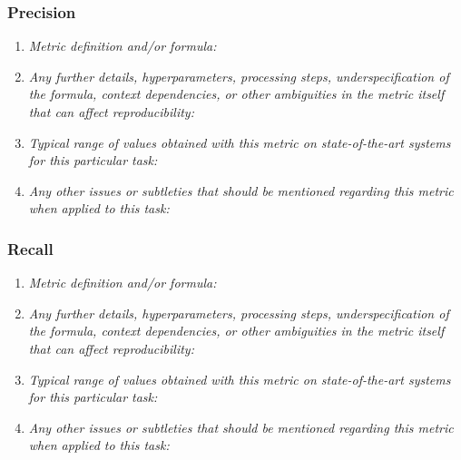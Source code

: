 \documentclass[a4paper,11pt]{article}
\begin{document}
        \subsubsection{Precision}
            \begin{enumerate}[label=\alph*.]
                \item \textit{Metric definition and/or formula:}
                \bigskip
                \item \textit{Any further details, hyperparameters, processing steps, underspecification of the formula, context dependencies, or other ambiguities in the metric itself that can affect reproducibility:}
                \bigskip
                \item \textit{Typical range of values obtained with this metric on state-of-the-art systems for this particular task:}
                \bigskip
                \item \textit{Any other issues or subtleties that should be mentioned regarding this metric when applied to this task:}
                \bigskip
            \end{enumerate}
        \subsubsection{Recall}
            \begin{enumerate}[label=\alph*.]
                \item \textit{Metric definition and/or formula:}
                \bigskip
                \item \textit{Any further details, hyperparameters, processing steps, underspecification of the formula, context dependencies, or other ambiguities in the metric itself that can affect reproducibility:}
                \bigskip
                \item \textit{Typical range of values obtained with this metric on state-of-the-art systems for this particular task:}
                \bigskip
                \item \textit{Any other issues or subtleties that should be mentioned regarding this metric when applied to this task:}
                \bigskip
            \end{enumerate}
\end{document}
